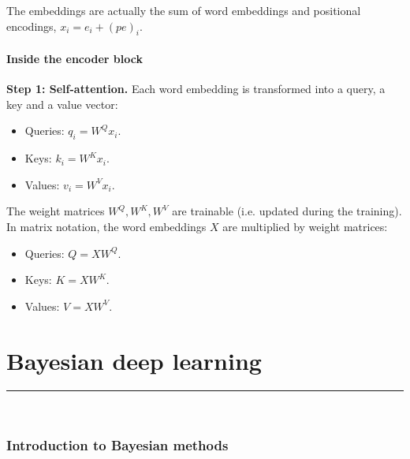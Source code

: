 The embeddings are actually the sum of word embeddings and positional encodings, $x_i = e_i + (pe)_i$. 




\minirule

\subsection{Inside the encoder block}
\textbf{Step 1: Self-attention.} Each word embedding is transformed into a query, a key and a value vector:
\begin{itemize}
\item Queries: $q_i = W^Q x_i$.
\item Keys: $k_i = W^K x_i$.
\item Values: $v_i = W^V x_i$.
\end{itemize}
The weight matrices $W^Q, W^K, W^V$ are trainable (i.e. updated during the training).\\

In matrix notation, the word embeddings $X$ are multiplied by weight matrices:
\begin{itemize}
\item Queries: $Q = XW^Q$.
\item Keys: $K = XW^K$.
\item Values: $V = XW^V$. 
\end{itemize}







\newpage
\part{Bayesian deep learning}
\hrule
\noindent \\
\section{Introduction to Bayesian methods}


